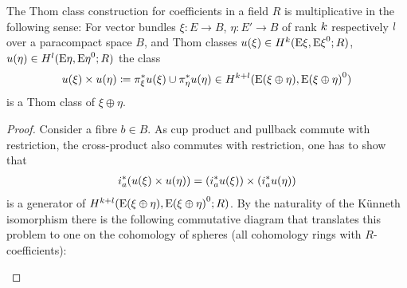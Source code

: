 \begin{Cor}\label{cor:thomclassmultiplicative}
  The Thom class construction for coefficients in a field $R$ is
  multiplicative in the following sense:
  For vector bundles $\xi\colon E\to B$, $\eta\colon E'\to B$
  of rank $k$ respectively $l$ over a paracompact space $B$, and Thom
  classes
  ${u}(\xi)\in H^{k}(\mathrm{E}\xi, {\mathrm{E}\xi}^0; R)$,
  ${u}(\eta)\in H^{l}(\mathrm{E}\eta, {\mathrm{E}\eta}^0; R)$
  the class
  \begin{gather*}
    {u}(\xi)\times{u}(\eta)
    \coloneqq {\pi}^*_\xi{u}(\xi) \cup {\pi}^*_\eta{u}(\eta)
    \in H^{k+l}(\mathrm{E}(\xi\oplus\eta), {\mathrm{E}(\xi\oplus\eta)}^0)
  \end{gather*}
  is a Thom class of $\xi\oplus\eta$.
  \begin{proof}
    Consider a fibre $b\in B$. As cup product and pullback commute
    with restriction, the cross-product also commutes with
    restriction, \idest one has to show that
    \begin{gather*}
      {i}^*_a({u}(\xi)\times{u}(\eta))
      = \left({i}^*_a{u}(\xi)\right)
      \times \left({i}^*_a{u}(\eta)\right)
    \end{gather*}
    is a generator of
    $H^{k+l}(\mathrm{E}(\xi\oplus\eta), {\mathrm{E}(\xi\oplus\eta)}^0;R)$.
    By the naturality of the Künneth isomorphism there is the
    following commutative diagram that translates this problem to one
    on the cohomology of spheres (all cohomology rings with
    $R$-coefficients):
    \begin{center}
\end{center}
\end{proof}
\end{Cor}
